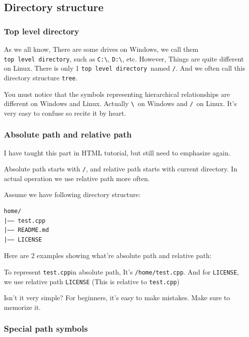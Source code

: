 \documentclass[12pt]{ctexart}
\begin{document}
\newpage
\subsection{\textbf{Directory structure}}

\subsubsection{\textbf{Top level directory}}

As we all know, There are some drives on Windows, we call them
\texttt{top\ level\ directory}, such as \texttt{C:\textbackslash{}},
\texttt{D:\textbackslash{}}, etc. However, Things are quite different on
Linux. There is only 1 \texttt{top\ level\ directory}\ named \texttt{/}.
And we often call this directory structure \texttt{tree}.

You must notice that the symbols representing hierarchical relationships
are different on Windows and Linux. Actually \texttt{\textbackslash{}}\
on Windows and \texttt{/}\ on Linux. It's very easy to
confuse so recite it by heart.

\subsubsection{\textbf{Absolute path and relative
path}}

I have taught this part in HTML tutorial, but still need to emphasize
again.

Absolute path starts with \texttt{/}, and relative path starts with
current directory. In actual operation we use relative path more often.

Assume we have following directory structure:

\begin{adjustwidth}{2em}{0pt}
\begin{verbatim}
home/
|—— test.cpp
|—— README.md
|—— LICENSE
\end{verbatim}
\end{adjustwidth}

Here are 2 examples showing what're absolute path and
relative path:

To represent \texttt{test.cpp}in absolute path, It's
\texttt{/home/test.cpp}. And for \texttt{LICENSE}, we use relative path
\texttt{LICENSE} (This is relative to \texttt{test.cpp})

Isn't it very simple? For beginners,
it's easy to make mistakes. Make sure to memorize it.

\subsubsection{\textbf{Special path symbols}}
\end{document}
